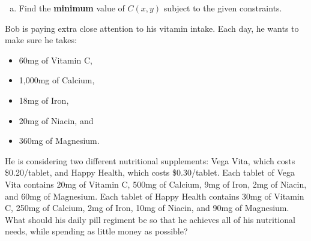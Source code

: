 \documentclass[11pt, legalpaper]{exam}
\begin{document}
\begin{questions}
\begin{enumerate}[(a)]
\item Find the \textbf{minimum} value of $C(x,y)$ subject to the given constraints.
\end{enumerate}
\newpage

\question[5] Bob is paying extra close attention to his vitamin intake.  Each day, he wants to make sure he takes:
\begin{itemize}
\item 60mg of Vitamin C,
\item 1,000mg of Calcium,
\item 18mg of Iron,
\item 20mg of Niacin, and
\item 360mg of Magnesium.
\end{itemize}
He is considering two different nutritional supplements: Vega Vita, which costs \$0.20/tablet, and Happy Health, which costs \$0.30/tablet.  Each tablet of Vega Vita contains 20mg of Vitamin C, 500mg of Calcium, 9mg of Iron, 2mg of Niacin, and 60mg of Magnesium.  Each tablet of  Happy Health contains 30mg of Vitamin C, 250mg of Calcium, 2mg of Iron, 10mg of Niacin, and 90mg of Magnesium.  What should his daily pill regiment be so that he achieves all of his nutritional needs, while spending as little money as possible?
\end{questions}
\end{document}
